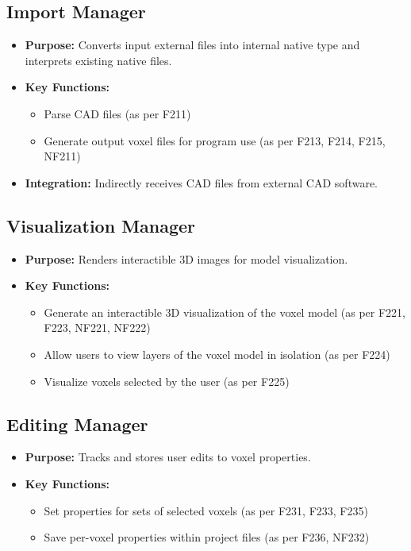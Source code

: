 \documentclass{article}
\begin{document}
\subsection{Import Manager}
\begin{itemize}
    \item \textbf{Purpose:} Converts input external files into internal native type and interprets existing native files.
    \item \textbf{Key Functions:} 
    \begin{itemize}
        \item Parse CAD files (as per F211)
        \item Generate output voxel files for program use (as per F213, F214, F215, NF211)
    \end{itemize}
    \item \textbf{Integration:} Indirectly receives CAD files from external CAD software.
\end{itemize}

\subsection{Visualization Manager}
\begin{itemize}
    \item \textbf{Purpose:} Renders interactible 3D images for model visualization.
    \item \textbf{Key Functions:} 
    \begin{itemize}
        \item Generate an interactible 3D visualization of the voxel model (as per F221, F223, NF221, NF222)
        \item Allow users to view layers of the voxel model in isolation (as per F224)
        \item Visualize voxels selected by the user (as per F225)
    \end{itemize}
\end{itemize}

\subsection{Editing Manager}
\begin{itemize}
    \item \textbf{Purpose:} Tracks and stores user edits to voxel properties.
    \item \textbf{Key Functions:} 
    \begin{itemize}
        \item Set properties for sets of selected voxels (as per F231, F233, F235)
        \item Save per-voxel properties within project files (as per F236, NF232)
    \end{itemize}
\end{itemize}
\end{document}

